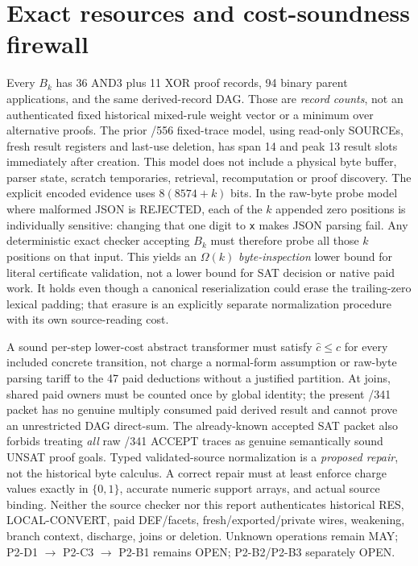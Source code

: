 \documentclass[11pt]{article}
\begin{document}
\section*{Exact resources and cost-soundness firewall}
Every $B_k$ has 36 AND3 plus 11 XOR proof records, 94 binary parent
applications, and the same derived-record DAG. Those are \emph{record
counts}, not an authenticated fixed historical mixed-rule weight vector
or a minimum over alternative proofs. The prior /556 fixed-trace model,
using read-only SOURCEs, fresh result registers and last-use deletion,
has span 14 and peak 13 result slots immediately after creation.
This model does not include a physical byte buffer, parser state,
scratch temporaries, retrieval, recomputation or proof discovery.
The explicit encoded evidence uses $8(8574+k)$ bits.
In the raw-byte probe model where malformed JSON is REJECTED,
each of the $k$ appended zero positions is individually sensitive:
changing that one digit to \texttt{x} makes JSON parsing fail.
Any deterministic exact checker accepting $B_k$ must therefore probe
all those $k$ positions on that input. This yields an
$\Omega(k)$ \emph{byte-inspection} lower bound for literal certificate
validation, not a lower bound for SAT decision or native paid work.
It holds even though a canonical reserialization could erase the
trailing-zero lexical padding; that erasure is an explicitly separate
normalization procedure with its own source-reading cost.

A sound per-step lower-cost abstract transformer must satisfy
$\widehat c\le c$ for every included concrete transition, not charge
a normal-form assumption or raw-byte parsing tariff to the 47 paid
deductions without a justified partition. At joins, shared paid owners
must be counted once by global identity; the present /341 packet has
no genuine multiply consumed paid derived result and cannot prove
an unrestricted DAG direct-sum. The already-known accepted SAT packet
also forbids treating \emph{all} raw /341 ACCEPT traces as genuine
semantically sound UNSAT proof goals. Typed validated-source
normalization is a \emph{proposed repair}, not the historical byte calculus.
A correct repair must at least enforce charge values exactly in
$\{0,1\}$, accurate numeric support arrays, and actual source binding.
Neither the source checker nor this report authenticates historical
RES, LOCAL-CONVERT, paid DEF/facets, fresh/exported/private wires,
weakening, branch context, discharge, joins or deletion. Unknown
operations remain MAY; P2-D1 $\to$ P2-C3 $\to$ P2-B1 remains OPEN;
P2-B2/P2-B3 separately OPEN.
\end{document}
